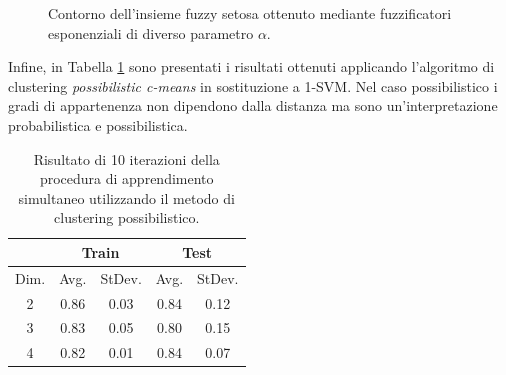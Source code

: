 \documentclass [11pt,a4paper,twoside,openright] {book}
\begin{document}
\begin{figure}[H]
          \caption{Contorno dell'insieme fuzzy setosa ottenuto mediante fuzzificatori esponenziali di diverso parametro $\alpha$.\label{exp}}
\end{figure}
\noindent
Infine, in Tabella \ref{pcm} sono presentati i risultati ottenuti applicando l'algoritmo di clustering \textit{possibilistic c-means} \cite{filippone2010applying} in sostituzione a 1-SVM. Nel caso possibilistico i gradi di appartenenza non dipendono dalla distanza ma sono un'interpretazione probabilistica e possibilistica.
\begin{table}[H]
\centering%
\caption{Risultato di 10 iterazioni della procedura di apprendimento simultaneo utilizzando il metodo di clustering possibilistico\label{pcm}.}
\begin{tabular}{|c|c|c|c|c|}
\hline
& \multicolumn{2}{|c|}{Train} & \multicolumn{2}{|c|}{Test} \\
\hline
Dim. & Avg. & StDev.& Avg. & StDev. \\
\hline
2 & 0.86 & 0.03 & 0.84 & 0.12   \\
3 & 0.83 & 0.05 & 0.80 & 0.15  \\
4 & 0.82 & 0.01 & 0.84 & 0.07 \\
\hline
\end{tabular}
\end{table}
\end{document}
